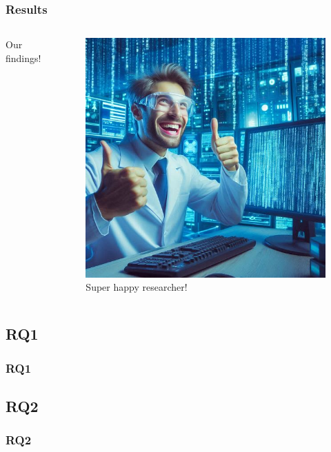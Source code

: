 \documentclass{beamer}
\begin{document}
\begin{frame}
  \frametitle{Results}
  \begin{columns}
    \begin{column}{0.5\textwidth}
      Our findings!
    \end{column}
    \begin{column}{0.5\textwidth}
      \begin{figure}
        \caption{Super happy researcher!\footnotemark[1]}
        \includegraphics[width=.8\textwidth]{images/results.jpeg}\footnotemark[1]
      \end{figure}
    \end{column}
  \end{columns}
\end{frame}

\subsection{RQ1}
\begin{frame}
  \frametitle{RQ1}
\end{frame}

\subsection{RQ2}
\begin{frame}
  \frametitle{RQ2}
\end{frame}
\end{document}
